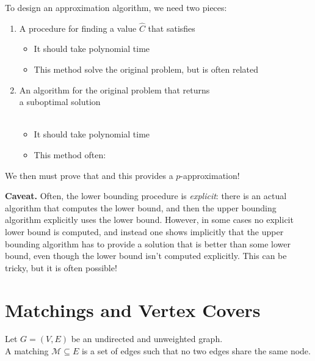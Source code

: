 \documentclass[11  pt]{article}
\begin{document}
	To design an approximation algorithm, we need two pieces:
	\begin{enumerate}
		\item {} A procedure for finding a value $\hat{C}$ that satisfies 
		\begin{itemize}
			\item It should take polynomial time \\
			\item This method  solve the original problem, but is often related
		\end{itemize}
		\item {} An algorithm for the original problem that returns \\
		
		a suboptimal solution  \\ \\
		\begin{itemize}
			\item It should take polynomial time \\
			\item This method often: \\
		\end{itemize}
	\end{enumerate}
	
	We then must prove that  and this provides a $p$-approximation! 
	
	\vfill
	
	
	\textbf{Caveat.} Often, the lower bounding procedure is \emph{explicit}: there is an actual algorithm that computes the lower bound, and then the upper bounding algorithm explicitly uses the lower bound. However, in some cases no explicit lower bound is computed, and instead one shows implicitly that the upper bounding algorithm has to provide a solution that is better than some lower bound, even though the lower bound isn't computed explicitly. This can be tricky, but it is often possible!
	
	\newpage
	\section{Matchings and Vertex Covers}
	Let $G = (V,E)$ be an undirected and unweighted graph. \\
	
	A matching $\mathcal{M} \subseteq E$ is a set of edges such that no two edges share the same node. \\ 
	
\end{document}
